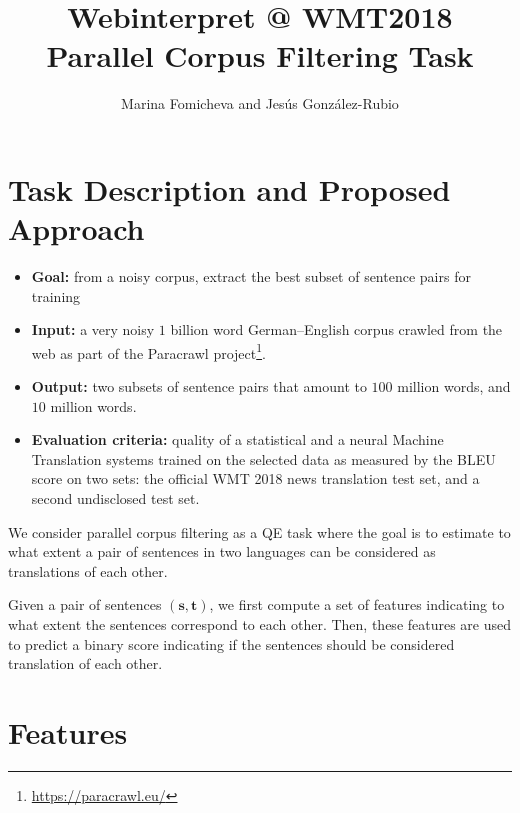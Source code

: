 \documentclass[a0]{sciposter}
\title{Webinterpret @ WMT2018\\Parallel Corpus Filtering Task}
\author{Marina Fomicheva and Jes\'{u}s Gonz\'{a}lez-Rubio}
\institute{AT Language Solutions, Webinterpret}
\begin{document}
\maketitle

\begin{multicols*}{2}



\section*{\Large Task Description and Proposed Approach}

\begin{itemize}
  \item {\large\bf Goal:} from a noisy corpus, extract the best subset of sentence pairs for training
  \item {\large\bf Input:} a very noisy $1$ billion word German--English corpus crawled from the web as part of the Paracrawl project\footnote{\url{https://paracrawl.eu/}}.
  \item {\large\bf Output:} two subsets of sentence pairs that amount to $100$ million words, and $10$ million words.
  \item {\large\bf Evaluation criteria:} quality of a statistical and a neural Machine Translation systems trained on the selected data as measured by the BLEU score on two sets: the official WMT 2018 news translation test set, and a second undisclosed test set.
\end{itemize}

We consider parallel corpus filtering as a QE task where the goal is to estimate to what extent a pair of sentences in two languages can be considered as translations of each other. 

Given a pair of sentences $(\mathbf{s}, \mathbf{t})$, we first compute a set of features indicating to what extent the sentences correspond to each other. Then, these features are used to predict a binary score indicating if the sentences should be considered translation of each other.


\section*{\Large Features}

\end{multicols*}
\end{document}
